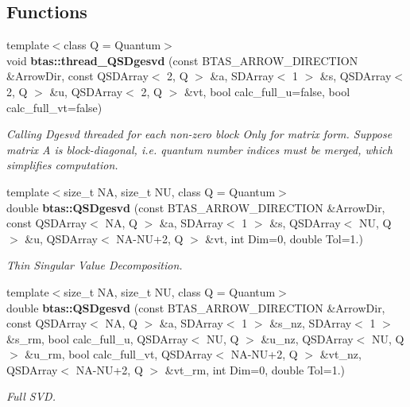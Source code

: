 \subsection*{Functions}
\begin{DoxyCompactItemize}
\item 
{\footnotesize template$<$class Q  = Quantum$>$ }\\void {\bf btas\-::thread\-\_\-\-Q\-S\-Dgesvd} (const B\-T\-A\-S\-\_\-\-A\-R\-R\-O\-W\-\_\-\-D\-I\-R\-E\-C\-T\-I\-O\-N \&Arrow\-Dir, const Q\-S\-D\-Array$<$ 2, Q $>$ \&a, S\-D\-Array$<$ 1 $>$ \&s, Q\-S\-D\-Array$<$ 2, Q $>$ \&u, Q\-S\-D\-Array$<$ 2, Q $>$ \&vt, bool calc\-\_\-full\-\_\-u=false, bool calc\-\_\-full\-\_\-vt=false)
\begin{DoxyCompactList}\small\item\em Calling Dgesvd threaded for each non-\/zero block Only for matrix form. Suppose matrix A is block-\/diagonal, i.\-e. quantum number indices must be merged, which simplifies computation. \end{DoxyCompactList}\item 
{\footnotesize template$<$size\-\_\-t N\-A, size\-\_\-t N\-U, class Q  = Quantum$>$ }\\double {\bf btas\-::\-Q\-S\-Dgesvd} (const B\-T\-A\-S\-\_\-\-A\-R\-R\-O\-W\-\_\-\-D\-I\-R\-E\-C\-T\-I\-O\-N \&Arrow\-Dir, const Q\-S\-D\-Array$<$ N\-A, Q $>$ \&a, S\-D\-Array$<$ 1 $>$ \&s, Q\-S\-D\-Array$<$ N\-U, Q $>$ \&u, Q\-S\-D\-Array$<$ N\-A-\/N\-U+2, Q $>$ \&vt, int Dim=0, double Tol=1.)
\begin{DoxyCompactList}\small\item\em Thin Singular Value Decomposition. \end{DoxyCompactList}\item 
{\footnotesize template$<$size\-\_\-t N\-A, size\-\_\-t N\-U, class Q  = Quantum$>$ }\\double {\bf btas\-::\-Q\-S\-Dgesvd} (const B\-T\-A\-S\-\_\-\-A\-R\-R\-O\-W\-\_\-\-D\-I\-R\-E\-C\-T\-I\-O\-N \&Arrow\-Dir, const Q\-S\-D\-Array$<$ N\-A, Q $>$ \&a, S\-D\-Array$<$ 1 $>$ \&s\-\_\-nz, S\-D\-Array$<$ 1 $>$ \&s\-\_\-rm, bool calc\-\_\-full\-\_\-u, Q\-S\-D\-Array$<$ N\-U, Q $>$ \&u\-\_\-nz, Q\-S\-D\-Array$<$ N\-U, Q $>$ \&u\-\_\-rm, bool calc\-\_\-full\-\_\-vt, Q\-S\-D\-Array$<$ N\-A-\/N\-U+2, Q $>$ \&vt\-\_\-nz, Q\-S\-D\-Array$<$ N\-A-\/N\-U+2, Q $>$ \&vt\-\_\-rm, int Dim=0, double Tol=1.)
\begin{DoxyCompactList}\small\item\em Full S\-V\-D. \end{DoxyCompactList}\end{DoxyCompactItemize}
